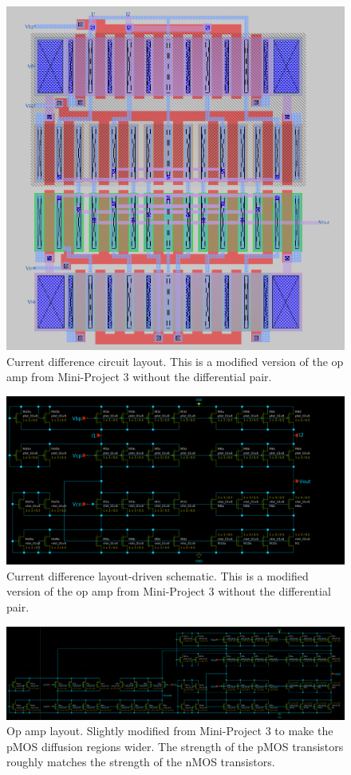 \documentclass{article}
\begin{document}
\begin{figure}[H]
    \centering{}
    \includegraphics[width=0.7\columnwidth]{images/current_difference_layout.png}
    \caption{Current difference circuit layout. This is a modified version of the op amp from Mini-Project 3 without the differential pair.}
    \label{fig:current_difference_layout}
\end{figure}

\begin{figure}[H]
    \centering{}
    \includegraphics[width=0.7\columnwidth]{images/current_difference_lvs_schematic.png}
    \caption{Current difference layout-driven schematic. This is a modified version of the op amp from Mini-Project 3 without the differential pair.}
    \label{fig:current_difference_schematic}
\end{figure}

\begin{figure}[H]
    \centering{}
    \includegraphics[width=0.7\columnwidth]{images/opamp_lvs_schematic.png}
    \caption{Op amp layout. Slightly modified from Mini-Project 3 to make the pMOS diffusion regions wider. The strength of the pMOS transistors roughly matches the strength of the nMOS transistors.}
    \label{fig:opamp_schematic}
\end{figure}
\end{document}

